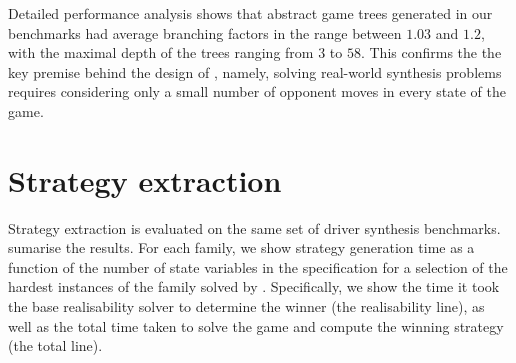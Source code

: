 {Detailed performance analysis shows that 
abstract game trees generated in our benchmarks had average 
branching factors in the range between $1.03$ and $1.2$, with 
the maximal depth of the trees ranging from $3$ to $58$.  This
confirms the the key premise behind the design of \eva, namely, 
solving real-world synthesis problems requires considering only a 
small number of opponent moves in every state of the game.}  

\section{Strategy extraction}


Strategy extraction is evaluated on the same set of driver synthesis benchmarks.   sumarise the results.  For each family, we show strategy generation time as a function of the number of state variables in the specification for a selection of the hardest instances of the family solved by \eva.  Specifically, we show the time it took the base realisability solver to determine the winner (the realisability line), as well as the total time taken to solve the game and compute the winning strategy (the total line).


